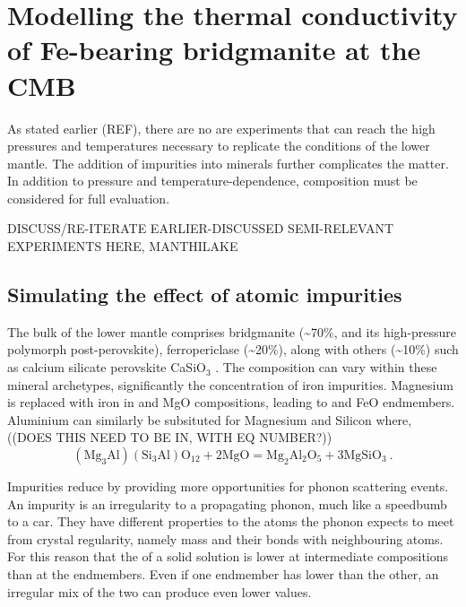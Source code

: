 \chapter{Modelling the thermal conductivity of Fe-bearing bridgmanite at the CMB} %

\label{Chapter4} %

As stated earlier (REF), there are no are experiments that can reach the high pressures and temperatures necessary to replicate the conditions of the lower mantle. The addition of impurities into minerals further complicates the matter. In addition to pressure and temperature-dependence, composition must be considered for full evaluation.

DISCUSS/RE-ITERATE EARLIER-DISCUSSED SEMI-RELEVANT EXPERIMENTS HERE, MANTHILAKE

\section{Simulating the effect of atomic impurities}

The bulk of the lower mantle comprises bridgmanite (\textasciitilde70\%, and its high-pressure polymorph post-perovskite), ferropericlase (\textasciitilde20\%), along with others (\textasciitilde10\%) such as calcium silicate perovskite CaSiO$_3$ \citep{Tronnes2009}. The composition can vary within these mineral archetypes, significantly the concentration of iron impurities. Magnesium is replaced with iron in 
\mgsios and MgO compositions, leading to \fesios and FeO endmembers. Aluminium can similarly be subsituted for Magnesium and Silicon
\citep[as in][]{Brodholt2000} where, ((DOES THIS NEED TO BE IN, WITH EQ NUMBER?))
%
\begin{equation}
\mathrm{ \left ( Mg_{3}Al \right )\left ( Si_{3}Al \right )O_{12} + 2MgO = Mg_{2}Al_{2}O_{5} + 3MgSiO_{3} }\ .
\label{eq.brodholt_al}
\end{equation}
%

Impurities reduce \tcs by providing more opportunities for phonon scattering events. An impurity is an irregularity to a propagating phonon, much like a speedbumb to a car. They have different properties to the atoms the phonon expects to meet from crystal regularity, namely mass and their bonds with neighbouring atoms. For this reason that the \tcs of a solid solution is lower at intermediate compositions than at the endmembers. Even if one endmember has lower \cs than the other, an irregular mix of the two can produce even lower values.


